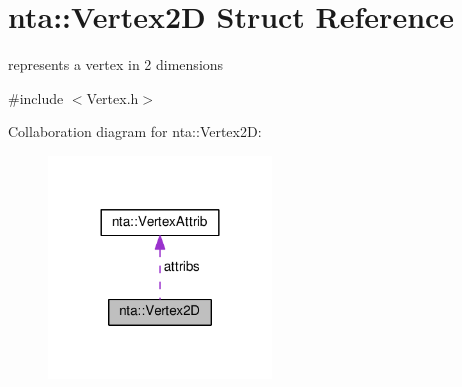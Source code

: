 \hypertarget{structnta_1_1Vertex2D}{}\section{nta\+:\+:Vertex2D Struct Reference}
\label{structnta_1_1Vertex2D}


represents a vertex in 2 dimensions  




{\ttfamily \#include $<$Vertex.\+h$>$}



Collaboration diagram for nta\+:\+:Vertex2D\+:
\nopagebreak
\begin{figure}[H]
\begin{center}
\leavevmode
\includegraphics[width=168pt]{df/deb/structnta_1_1Vertex2D__coll__graph}
\end{center}
\end{figure}
